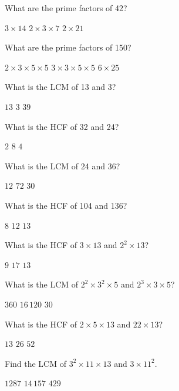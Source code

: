 \documentclass{article}
\theoremstyle{break}
\begin{document}
\begin{questions}

\question
What are the prime factors of 42?
\begin{choices}
\choice $3\times 14$
\correctchoice $2\times 3\times 7$
\choice $2\times 21$
\end{choices}

\question
What are the prime factors of 150?
\begin{choices}
\correctchoice $2\times 3\times 5\times 5$
\choice $3\times 3\times 5\times 5$
\choice $6\times 25$
\end{choices}

\question
What is the LCM of 13 and 3?
\begin{choices}
\choice $13$
\choice $3$
\correctchoice $39$
\end{choices}

\question
What is the HCF of 32 and 24?
\begin{choices}
\choice $2$
\correctchoice $8$
\choice $4$
\end{choices}

\question
What is the LCM of 24 and 36?
\begin{choices}
\choice $12$
\correctchoice $72$
\choice $30$
\end{choices}

\question
What is the HCF of 104 and 136?
\begin{choices}
\correctchoice $8$
\choice $12$
\choice $13$
\end{choices}

\question
What is the HCF of $3\times 13$ and $2^2\times 13$?
\begin{choices}
\choice $9$
\choice $17$
\correctchoice $13$
\end{choices}

\newpage %
\question
What is the LCM of $2^2\times 3^2\times 5$ and $2^3\times 3\times 5$?
\begin{choices}
\correctchoice $360$
\choice $16\,120$
\choice $30$
\end{choices}

\question
What is the HCF of $2\times 5\times 13$ and $22\times 13$?
\begin{choices}
\choice $13$
\correctchoice $26$
\choice $52$
\end{choices}

\question
Find the LCM of $3^2\times 11\times 13$ and $3\times 11^2$.
\begin{choices}
\choice $1287$
\correctchoice $14\,157$
\choice $429$
\end{choices}

\end{questions}


\end{document}
